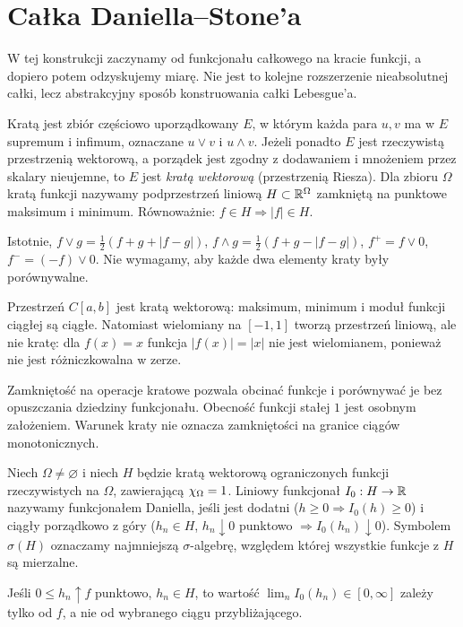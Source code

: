 \section{Całka Daniella--Stone'a}
W tej konstrukcji zaczynamy od funkcjonału całkowego na kracie funkcji, a dopiero potem odzyskujemy miarę. Nie jest to kolejne rozszerzenie nieabsolutnej całki, lecz abstrakcyjny sposób konstruowania całki Lebesgue'a.
\begin{definicja}
Kratą jest zbiór częściowo uporządkowany $E$, w którym każda para $u,v$ ma w $E$ supremum i infimum, oznaczane $u\vee v$ i $u\wedge v$. Jeżeli ponadto $E$ jest rzeczywistą przestrzenią wektorową, a porządek jest zgodny z dodawaniem i mnożeniem przez skalary nieujemne, to $E$ jest \emph{kratą wektorową} (przestrzenią Riesza). Dla zbioru $\Omega$ kratą funkcji nazywamy podprzestrzeń liniową $H\subset\mathbb R^\Omega$ zamkniętą na punktowe maksimum i minimum. Równoważnie: $f\in H\Rightarrow|f|\in H$.
\end{definicja}
Istotnie, $f\vee g=\tfrac12(f+g+|f-g|)$, $f\wedge g=\tfrac12(f+g-|f-g|)$, $f^+=f\vee0$, $f^-=(-f)\vee0$. Nie wymagamy, aby każde dwa elementy kraty były porównywalne.
\begin{przyklad}
Przestrzeń $C[a,b]$ jest kratą wektorową: maksimum, minimum i moduł funkcji ciągłej są ciągłe. Natomiast wielomiany na $[-1,1]$ tworzą przestrzeń liniową, ale nie kratę: dla $f(x)=x$ funkcja $|f(x)|=|x|$ nie jest wielomianem, ponieważ nie jest różniczkowalna w zerze.
\end{przyklad}
\begin{uwaga}
Zamkniętość na operacje kratowe pozwala obcinać funkcje i porównywać je bez opuszczania dziedziny funkcjonału. Obecność funkcji stałej $1$ jest osobnym założeniem. Warunek kraty nie oznacza zamkniętości na granice ciągów monotonicznych.
\end{uwaga}
\begin{definicja}
Niech $\Omega\ne\varnothing$ i niech $H$ będzie kratą wektorową ograniczonych funkcji rzeczywistych na $\Omega$, zawierającą $\chi_{\Omega}=1$. Liniowy funkcjonał $I_0:H\to\mathbb R$ nazywamy funkcjonałem Daniella, jeśli jest dodatni ($h\ge0\Rightarrow I_0(h)\ge0$) i ciągły porządkowo z góry ($h_n\in H$, $h_n\downarrow0$ punktowo $\Rightarrow I_0(h_n)\downarrow0$). Symbolem $\sigma(H)$ oznaczamy najmniejszą $\sigma$-algebrę, względem której wszystkie funkcje z $H$ są mierzalne.
\end{definicja}
\begin{lemat}
Jeśli $0\le h_n\uparrow f$ punktowo, $h_n\in H$, to wartość $\lim_n I_0(h_n)\in[0,\infty]$ zależy tylko od $f$, a nie od wybranego ciągu przybliżającego.
\end{lemat}
